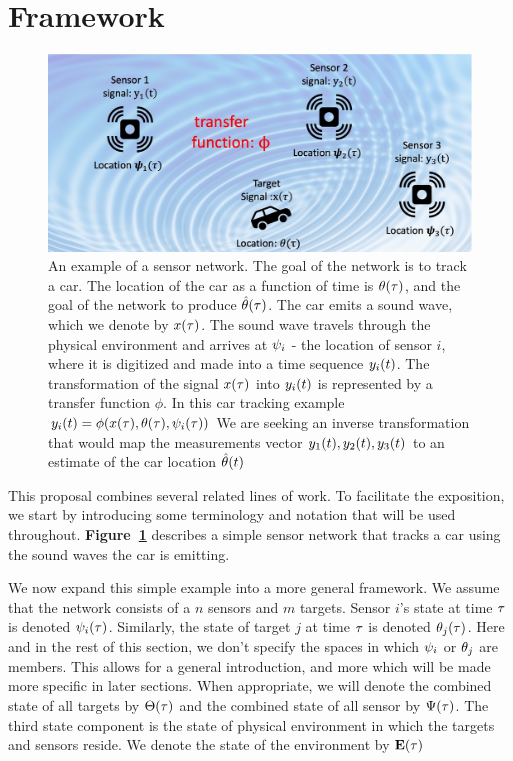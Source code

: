 \section{Framework}

\begin{figure}[t]
\centering
\includegraphics[width=0.7\columnwidth]{figs/Framework.jpg}
\caption{An example of a sensor
  network\label{fig:prototypicalSensorNetwork}. The goal of the
  network is to track a car. The location of the car as a function of
  time is $\theta(\tau)$, and the goal of the network to produce
  $\hat{\theta}(\tau)$. The car emits a sound wave, which we denote by
  $x(\tau)$. The sound wave travels through the physical environment
  and arrives at $\psi_i$ - the location of sensor $i$, where it is digitized and made into a time sequence $y_i(t)$. The transformation of the signal $x(\tau)$ into $y_i(t)$ is represented by a transfer function $\phi$. In this car tracking example 
$y_i(t) =
\phi(x(\tau),\theta(\tau),\psi_i(\tau))$
We are seeking an inverse transformation that would map the measurements vector $y_1(t),y_2(t),y_3(t)$ to an estimate of the car location $\hat{\theta}(t)$}
\end{figure}

This proposal combines several related lines of work. To facilitate the exposition, we start by introducing some terminology and notation that will be used throughout. {\bf Figure~\ref{fig:prototypicalSensorNetwork}} describes a simple sensor network that tracks a car using the sound waves the car is emitting.

We now expand this simple example into a more general framework.
We assume that the network consists of a $n$ sensors and $m$ 
targets. Sensor $i$'s state at time $\tau$ is denoted $\psi_i(\tau)$.  Similarly, the state of target $j$ at time $\tau$ is denoted $\theta_j(\tau)$.
Here and in the rest of this section, we don't specify the spaces in which  $\psi_i$ or $\theta_j$ are members. This allows for a general introduction, and more which will be made more specific in later sections. When appropriate, we will denote the combined state of all targets by $\Theta(\tau)$ and the combined state of all sensor by $\Psi(\tau)$. The third state component is the state of physical environment in which the targets and sensors reside. We denote the state of the environment by $\mathbf{E}(\tau)$

